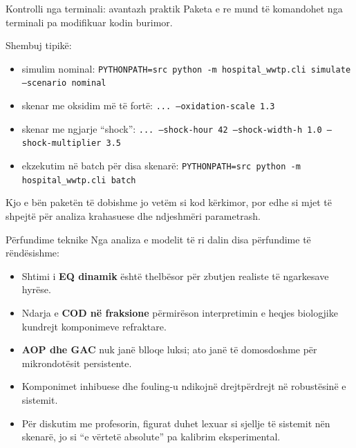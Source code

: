 \documentclass[aspectratio=169]{beamer}
\newcommand{\code}[1]{\texttt{#1}}
\begin{document}
\begin{frame}{Kontrolli nga terminali: avantazh praktik}
\justifying
Paketa e re mund të komandohet nga terminali pa modifikuar kodin burimor.
\vspace{0.4em}

Shembuj tipikë:
\begin{itemize}
    \item simulim nominal:
    \code{PYTHONPATH=src python -m hospital\_wwtp.cli simulate --scenario nominal}
    \item skenar me oksidim më të fortë:
    \code{... --oxidation-scale 1.3}
    \item skenar me ngjarje ``shock'':
    \code{... --shock-hour 42 --shock-width-h 1.0 --shock-multiplier 3.5}
    \item ekzekutim në batch për disa skenarë:
    \code{PYTHONPATH=src python -m hospital\_wwtp.cli batch}
\end{itemize}
\vspace{0.5em}
Kjo e bën paketën të dobishme jo vetëm si kod kërkimor, por edhe si mjet të shpejtë për analiza krahasuese dhe ndjeshmëri parametrash.
\end{frame}

\begin{frame}{Përfundime teknike}
\justifying
Nga analiza e modelit të ri dalin disa përfundime të rëndësishme:
\begin{itemize}
    \item Shtimi i \textbf{EQ dinamik} është thelbësor për zbutjen realiste të ngarkesave hyrëse.
    \item Ndarja e \textbf{COD në fraksione} përmirëson interpretimin e heqjes biologjike kundrejt komponimeve refraktare.
    \item \textbf{AOP dhe GAC} nuk janë blloqe luksi; ato janë të domosdoshme për mikrondotësit persistente.
    \item Komponimet inhibuese dhe fouling-u ndikojnë drejtpërdrejt në robustësinë e sistemit.
    \item Për diskutim me profesorin, figurat duhet lexuar si \alert{sjellje të sistemit nën skenarë}, jo si ``e vërtetë absolute'' pa kalibrim eksperimental.
\end{itemize}
\end{frame}
\end{document}
